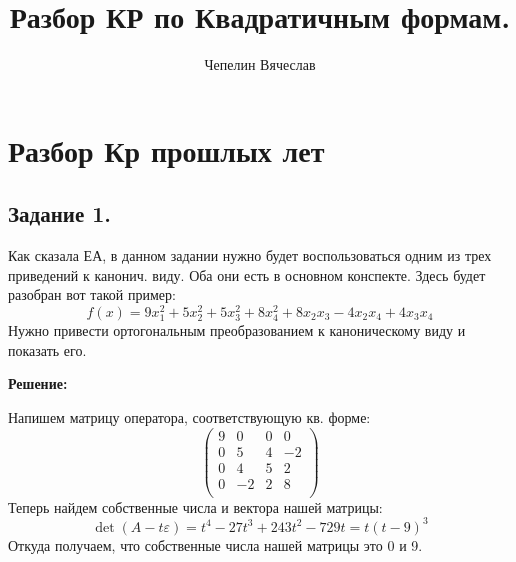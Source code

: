 \documentclass{article}
\title{Разбор КР по Квадратичным формам.}
\author{Чепелин Вячеслав}
\date{}
\begin{document}
\maketitle
\tableofcontents
\newpage

\section{Разбор Кр прошлых лет}
\subsection{Задание 1.}

Как сказала ЕА, в данном задании нужно будет воспользоваться  одним из трех приведений к канонич. виду. Оба они есть в основном конспекте. Здесь будет разобран вот такой пример:
$$f(x) = 9x_1^2 +5x_2^2+5x_3^2  +8x_4^2 + 8x_2x_3- 4x_2x_4 + 4x_3x_4$$
Нужно привести ортогональным преобразованием к каноническому виду и показать его.

\textbf{Решение:}

Напишем матрицу оператора, соответствующую кв. форме:
$$\begin{pmatrix}
    9 & 0& 0& 0\\
    0 & 5 & 4& -2\\
     0 & 4 & 5 &2 \\
      0 & -2 & 2&8 \\
\end{pmatrix}$$
Теперь найдем собственные числа и вектора нашей матрицы:
$$\det(A-t\varepsilon) =  
t^4-27t^3+243t^2-729t = t(t-9)^3$$
Откуда получаем, что собственные числа нашей матрицы это 0 и 9.
\end{document}
